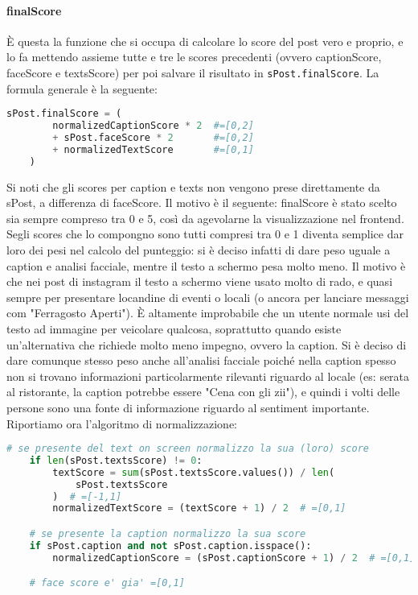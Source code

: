 \paragraph{finalScore}
È questa la funzione che si occupa di calcolare lo score del post vero e proprio, e lo fa
mettendo assieme tutte e tre le scores precedenti (ovvero captionScore, faceScore e textsScore)
per poi salvare il risultato in \verb+sPost.finalScore+.
La formula generale è la seguente:
\begin{lstlisting}[language=Python]
    sPost.finalScore = (
        normalizedCaptionScore * 2  #=[0,2]
        + sPost.faceScore * 2       #=[0,2]
        + normalizedTextScore       #=[0,1]
    )
\end{lstlisting}
Si noti che gli scores per caption e texts non vengono prese direttamente da sPost, a differenza
di faceScore. 
Il motivo è il seguente: finalScore è stato scelto sia sempre compreso tra 0 e 5,
così da agevolarne la visualizzazione nel frontend. Segli scores che lo compongno sono tutti
compresi tra 0 e 1 diventa semplice dar loro dei pesi nel calcolo del punteggio: si è deciso
infatti di dare peso uguale a caption e analisi facciale, mentre il testo a schermo pesa molto meno.
Il motivo è che nei post di instagram il testo a schermo viene usato molto di rado, e quasi sempre
per presentare locandine di eventi o locali (o ancora per lanciare messaggi com "Ferragosto Aperti").
È altamente improbabile che un utente normale usi del testo ad immagine per veicolare qualcosa,
soprattutto quando esiste un'alternativa che richiede molto meno impegno, ovvero la caption.
Si è deciso di dare comunque stesso peso anche all'analisi facciale poiché nella caption spesso
non si trovano informazioni particolarmente rilevanti riguardo al locale (es: serata al ristorante,
la caption potrebbe essere "Cena con gli zii"), e quindi i volti delle persone sono una fonte di
informazione riguardo al sentiment importante.
Riportiamo ora l'algoritmo di normalizzazione:
\begin{lstlisting}[language=Python]
    # se presente del text on screen normalizzo la sua (loro) score
    if len(sPost.textsScore) != 0:
        textScore = sum(sPost.textsScore.values()) / len(
            sPost.textsScore
        )  # =[-1,1]
        normalizedTextScore = (textScore + 1) / 2  # =[0,1]

    # se presente la caption normalizzo la sua score
    if sPost.caption and not sPost.caption.isspace():
        normalizedCaptionScore = (sPost.captionScore + 1) / 2  # =[0,1]

    # face score e' gia' =[0,1]
\end{lstlisting}
